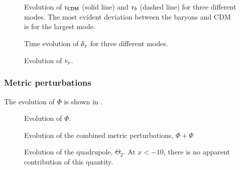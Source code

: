 \begin{figure}[ht!]
    \caption{Evolution of $v_\mathrm{CDM}$ (solid line) and $v_b$ (dashed line) for three different modes. The most evident deviation between the baryons and CDM is for the largest mode.}
    \label{fig:M3:results:vels}
\end{figure}

\begin{figure}[ht!]
    \caption{Time evolution of $\delta_\gamma$ for three different modes. }
    \label{fig:M3:results:delta_gamma}
\end{figure}

\begin{figure}[ht!]
    \caption{Evolution of $v_\gamma$.}
    \label{fig:M3:results:v_gamma}
\end{figure}

\subsubsection{Metric perturbations} \label{sssec:M3:results:metric_perturbations}
The evolution of $\Phi$ is shown in . 
\begin{figure}[ht!]
    \caption{Evolution of $\Phi$.}
    \label{fig:M3:results:Phi}
\end{figure}


\begin{figure}[ht!]
    \caption{Evolution of the combined metric perturbations, $\Phi+\Psi$}
    \label{fig:M3:results:Phi_plus_Psi}
\end{figure}



\begin{figure}[ht!]
    \caption{Evolution of the quadrupole, $\Theta_2$. At $x<-10$, there is no apparent contribution of this quantity.}
    \label{fig:M3:results:Theta2}
\end{figure}
